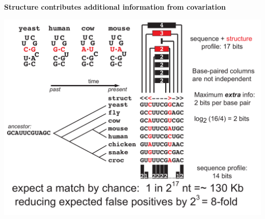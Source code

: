 \documentclass[landscape]{slides}
\begin{document}
\begin{slide}
\begin{center}
\textbf{Structure contributes additional information from covariation}
\medskip

\includegraphics[width=9in]{figs/seqstructprofiles-2014-structinfo}
\end{center}

\vfill
\end{slide}
\end{document}
